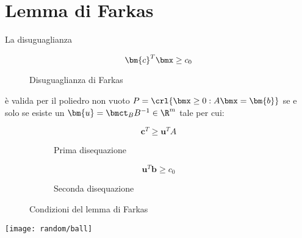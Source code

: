 \documentclass[\main/main.tex]{subfiles}
\begin{document}
\section{Lemma di Farkas}

\begin{minipage}{\textwidth}
  \begin{minipage}{.83\textwidth}
    \flushleft
    \begin{theorem}
      \label{lemma_farkas}
      La disuguaglianza
      \begin{figure}
        \[
          \bm{c}^T\bmx  \geq c_0
        \]
        \caption{Disuguaglianza di Farkas}
      \end{figure}
      è valida per il poliedro non vuoto $P = \crl{\bmx \geq 0: A\bmx = \bm{b}}$ se e solo se esiste un $\bm{u} = \bmct_B B^{-1} \in \R^m$ tale per cui:

      \begin{figure}
        \begin{subfigure}{0.49\textwidth}
          \[
            \bm{c}^T \geq \bm{u}^TA
          \]
          \caption{Prima disequazione}
          \label{farkas_prima}
        \end{subfigure}
        \begin{subfigure}{0.49\textwidth}
          \[
            \bm{u}^T\bm{b}\geq c_0
          \]
          \caption{Seconda disequazione}
          \label{farkas_seconda}
        \end{subfigure}
        \caption{Condizioni del lemma di Farkas}
      \end{figure}
    \end{theorem}
  \end{minipage}\hfill
  \begin{minipage}{0.15\textwidth}\center
    \texttt{[image: random/ball]}
  \end{minipage}
\end{minipage}
\end{document}
